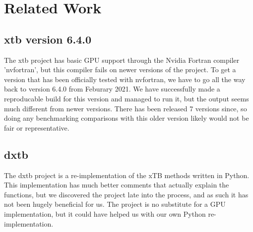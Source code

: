 \chapter{Related Work}\label{sec:related}

\section{xtb version 6.4.0}
The xtb project has basic GPU support through the Nvidia Fortran compiler 'nvfortran', but this compiler fails on newer versions of the project. To get a version that has been officially tested with nvfortran, we have to go all the way back to version 6.4.0 from Feburary 2021.
We have successfully made a reproducable build for this version and managed to run it, but the output seems much different from newer versions. There has been released 7 versions since, so doing any benchmarking comparisons with this older version likely would not be fair or representative.

\section{dxtb}
The dxtb project is a re-implementation of the xTB methods written in Python. This implementation has much better comments that actually explain the functions, but we discovered the project late into the process, and as such it has not been hugely beneficial for us.
The project is no substitute for a GPU implementation, but it could have helped us with our own Python re-implementation.
